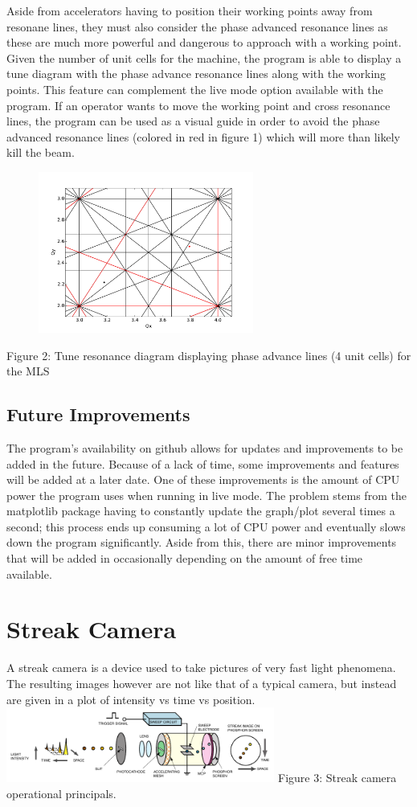 \documentclass[%
 reprint,%
 amssymb, amsmath,%
 aip,cha,%
]{revtex4-1}
\begin{document}
Aside from accelerators having to position their working points away from resonane lines, they must also consider the phase advanced resonance lines as these are much more powerful and dangerous to approach with a working point. Given the number of unit cells for the machine, the program is able to display a tune diagram with the phase advance resonance lines along with the working points. This feature can complement the live mode option available with the program. If an operator wants to move the working point and cross resonance lines, the program can be used as a visual guide in order to avoid the phase advanced resonance lines (colored in red in figure 1) which will more than likely kill the beam.
\begin{figure}
\begin{center}
\includegraphics[width=200pt]{image.pdf}
\end{center}
\end{figure}
Figure 2: Tune resonance diagram displaying phase advance lines (4 unit cells) for the MLS

\subsection{Future Improvements}
The program's availability on github\cite{Note1} allows for updates and improvements to be added in the future. Because of a lack of time, some improvements and features will be added at a later date. One of these improvements is the amount of CPU power the program uses when running in live mode. The problem stems from the matplotlib package having to constantly update the graph/plot several times a second; this process ends up consuming a lot of CPU power and eventually slows down the program significantly. Aside from this, there are minor improvements that will be added in occasionally depending on the amount of free time available.

\section{Streak Camera}
A streak camera is a device used to take pictures of very fast light phenomena. The resulting images however are not like that of a typical camera, but instead are given in a plot of intensity vs time vs position.
\includegraphics[width=250pt]{streakdiagram.pdf}
Figure 3: Streak camera operational principals\cite{Note2}. \\
\end{document}
